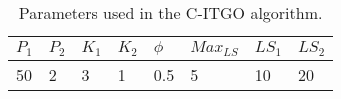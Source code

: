 
\begin{table*}[h]
\begin{center}
\tiny
\def\arraystretch{1.5}%
\begin{tabular}{ | P{1.0cm} | P{1.0cm} | P{1.0cm} | P{1.0cm} | P{1.0cm} | P{1.0cm} | P{1.0cm} | P{1.0cm} | }

    \hline

    $P_1$ & $P_2$ & $K_1$ & $K_2$ & $\phi$ & $Max_{LS}$ & $LS_1$ & $LS_2$ \\

    \hline

    50 & 2 & 3 & 1 & 0.5 & 5 & 10 & 20 \\
    
    \hline
    
    
\end{tabular}
\end{center}
\vspace{-0.6cm}
\caption{Parameters used in the C-ITGO algorithm.}
\label{tab:ITGO}
\end{table*}